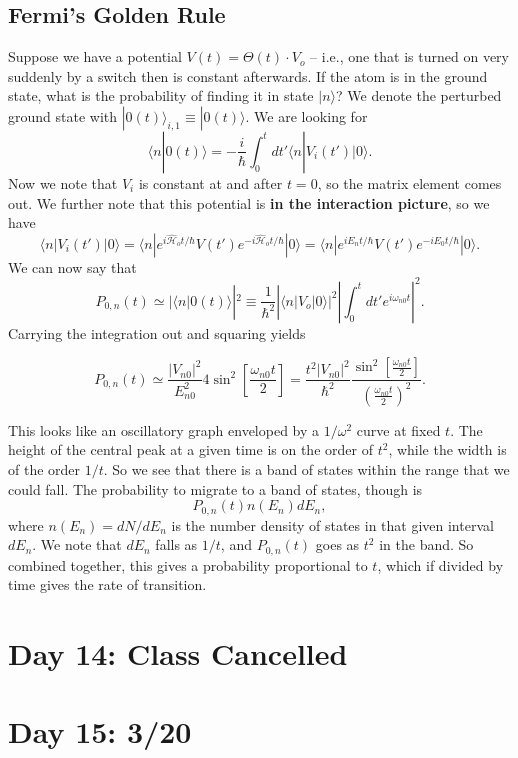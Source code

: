 \documentclass[fontsize=12pt]{scrartcl}
\newcommand{\la}{\langle}
\newcommand{\ra}{\rangle}
\newcommand{\Ham}{\hat{\mathcal{H}}}
\begin{document}
\subsection{Fermi's Golden Rule}


Suppose we have a potential $V(t)=\Theta(t)\cdot V_o$ -- i.e., one that is turned on very suddenly by a switch then is constant afterwards. If the atom is in the ground state, what is the probability of finding it in state $|n\ra$? We denote the perturbed ground state with $|0(t)\ra_{i, 1}\equiv |0(t)\ra$. We are looking for $$\la n |0(t)\ra = -\frac{i}{\hbar}\int_0^t dt' \la n|V_i(t')|0\ra.$$ Now we note that $V_i$ is constant at and after $t=0$, so the matrix element comes out. We further note that this potential is \textbf{in the interaction picture}, so we have $$\la n |V_i(t')|0\ra = \la n | e^{i\Ham_ot/\hbar}V(t')e^{-i\Ham_ot/\hbar}|0\ra = \la n| e^{iE_nt/\hbar}V(t')e^{-iE_0t/\hbar}|0\ra.$$ We can now say that $$P_{0,n}(t)\simeq |\la n|0(t)\ra|^2 \equiv \frac{1}{\hbar^2}|\la n |V_o|0\ra|^2 \left|\int_0^t dt' e^{i\omega_{n0}t}\right|^2.$$ Carrying the integration out and squaring yields \begin{mdframed} $$P_{0,n}(t)\simeq \frac{|V_{n0}|^2}{E_{n0}^2} 4\sin^2\left[\frac{\omega_{n0}t}{2}\right] = \frac{t^2|V_{n0}|^2}{\hbar^2} \frac{\sin^2\left[\frac{\omega_{n0}t}{2}\right]}{\left(\frac{\omega_{n0}t}{2}\right)^2}.$$ \end{mdframed} This looks like an oscillatory graph enveloped by a $1/\omega^2$ curve at fixed $t$. The height of the central peak at a given time is on the order of $t^2$, while the width is of the order $1/t$. So we see that there is a band of states within the range that we could fall. The probability to migrate to a band of states, though is $$P_{0,n}(t)n(E_n)dE_n,$$ where $n(E_n)=dN/dE_n$ is the number density of states in that given interval $dE_n$. We note that $dE_n$ falls as $1/t$, and $P_{0,n}(t)$ goes as $t^2$ in the band. So combined together, this gives a probability proportional to $t$, which if divided by time gives the rate of transition.

\section{Day 14: Class Cancelled}

\section{Day 15: 3/20}
\end{document}
